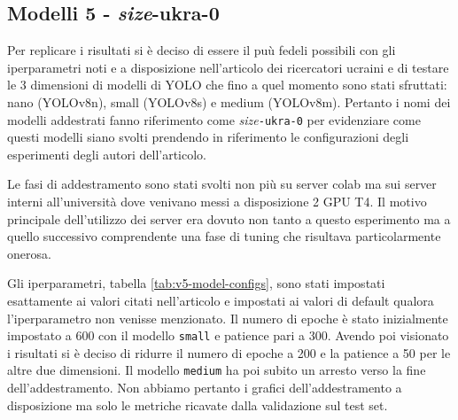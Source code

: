 \subsection*{Modelli 5 - \textit{size}-ukra-0}


Per replicare i risultati si è deciso di essere il puù fedeli possibili con gli iperparametri 
noti e a disposizione nell'articolo dei ricercatori ucraini e di testare le 3 dimensioni di modelli
di YOLO che fino a quel momento sono stati sfruttati: nano (YOLOv8n), small (YOLOv8s) e medium (YOLOv8m).
Pertanto i nomi dei modelli addestrati fanno riferimento come \textit{size}\texttt{-ukra-0} per 
evidenziare come questi modelli siano svolti prendendo in riferimento le configurazioni degli 
esperimenti degli autori dell'articolo.

Le fasi di addestramento sono stati svolti non più su server colab ma sui server interni 
all'università dove venivano messi a disposizione 2 GPU T4. Il motivo principale dell'utilizzo dei 
server era dovuto non tanto a questo esperimento ma a quello successivo comprendente una fase di 
tuning che risultava particolarmente onerosa.

Gli iperparametri, tabella \ref{tab:v5-model-configs}, sono stati impostati esattamente ai valori citati nell'articolo e impostati
ai valori di default qualora l'iperparametro non venisse menzionato. Il numero di epoche è stato inizialmente
impostato a 600 con il modello \texttt{small} e patience pari a 300. Avendo poi visionato i 
risultati si è deciso di ridurre il numero di epoche a 200 e la patience a 50 per le altre due 
dimensioni. Il modello \texttt{medium} ha poi subito un arresto verso la fine dell'addestramento. Non 
abbiamo pertanto i grafici dell'addestramento a disposizione ma solo le metriche ricavate dalla validazione
sul test set.



